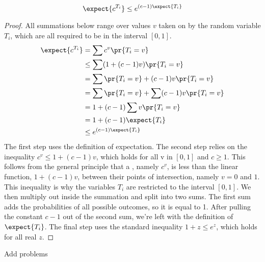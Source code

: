 \begin{lemma}
\label{chernoff-lemma2}
\[
\expect{c^{T_i}} \leq e^{(c - 1) \expect{T_i}}
\]
\end{lemma}

\begin{proof}
All summations below range over values $v$ taken on by the random
variable $T_i$, which are all required to be in the interval $[0, 1]$.
\begin{align*}
\expect{c^{T_i}} & = \sum c^v \pr{T_i = v} \\
           & \leq \sum (1 + (c-1) v) \pr{T_i = v} \\
           & = \sum \pr{T_i = v} + (c-1) v \pr{T_i = v} \\
           & = \sum \pr{T_i = v} + \sum(c-1) v \pr{T_i = v} \\
           & = 1 + (c - 1) \sum v \pr{T_i = v} \\
           & = 1 + (c - 1) \expect{T_i} \\
           & \leq e^{(c - 1) \expect{T_i}}
\end{align*}
The first step uses the definition of expectation.  The second step
relies on the inequality $c^v \leq 1 + (c-1) v$, which holds for all v
in $[0,1]$ and $c \geq 1$.  This follows from the general principle
that a , namely $c^v$, is less than the linear
function, $1 + (c-1) v$, between their points of intersection, namely
$v = 0$ and $1$.  This inequality is why the variables $T_i$ are
restricted to the interval $[0, 1]$.  We then multiply out inside the
summation and split into two sums.  The first sum adds the
probabilities of all possible outcomes, so it is equal to 1.  After
pulling the constant $c - 1$ out of the second sum, we're left with
the definition of $\expect{T_i}$.  The final step uses the standard
inequality $1 + z \leq e^z$, which holds for all real $z$.
\end{proof}

\begin{editingnotes}
Add problems
\end{editingnotes}

\iffalse

\begin{problems}
\classproblems

\end{problems}
\fi

\endinput

